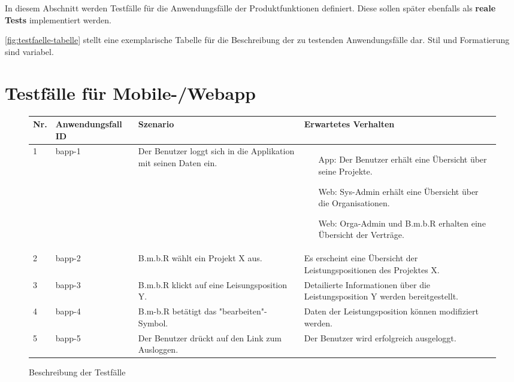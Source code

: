 \begin{tcolorbox}
In diesem Abschnitt werden Testfälle für die Anwendungsfälle der Produktfunktionen definiert.
Diese sollen später ebenfalls als \textbf{reale Tests} implementiert werden.

\autoref{fig:testfaelle-tabelle} stellt eine exemplarische Tabelle für die Beschreibung der zu testenden Anwendungsfälle dar. 
Stil und Formatierung sind variabel.
\end{tcolorbox}

\section{Testfälle für Mobile-/Webapp}
\begin{figure}[!h]
	\begin{center}
		\begin{tabularx}{\textwidth}{ p{} | p{} | p{} | X }
			\textbf{Nr.} & \textbf{Anwendungsfall ID} & \textbf{Szenario} & \textbf{Erwartetes Verhalten} \\ \hline
			1 & bapp-1 & Der Benutzer loggt sich in die Applikation mit seinen Daten ein. & 
			\begin{itemize}
				\item[App:] Der Benutzer erhält eine Übersicht über seine Projekte.
				\item[Web:] Sys-Admin erhält eine Übersicht über die Organisationen.
				\item[Web:] Orga-Admin und B.m.b.R erhalten eine Übersicht der Verträge.
			\end{itemize} \\ \hline
			2 & bapp-2 & B.m.b.R wählt ein Projekt X aus. & Es erscheint eine Übersicht der Leistungspositionen des Projektes X. \\ \hline
			3 & bapp-3 & B.m.b.R klickt auf eine Leisungsposition Y. & Detailierte Informationen über die Leistungsposition Y werden bereitgestellt. \\ \hline
			4 & bapp-4 & B.m-b.R betätigt das "bearbeiten"-Symbol. & Daten der Leistungsposition können modifiziert werden. \\ \hline
			5 & bapp-5 & Der Benutzer drückt auf den Link zum Ausloggen. & Der Benutzer wird erfolgreich ausgeloggt. \\ \hline
		\end{tabularx}	
	\end{center}
	\caption{Beschreibung der Testfälle}
	\label{fig:testfaelle-beide-anwendungen-tabelle}
\end{figure}

